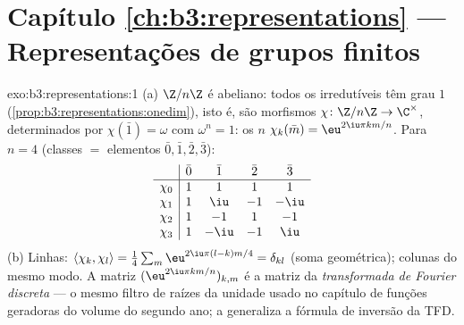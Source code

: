 \section*{Capítulo \ref{ch:b3:representations} --- Representações de grupos
finitos}

\begin{solution}{exo:b3:representations:1}
(a) $\Z/n\Z$ é abeliano: todos os irredutíveis têm grau $1$
(\cref{prop:b3:representations:onedim}), isto é, são morfismos
$\chi \colon \Z/n\Z \to \C^\times$, determinados por $\chi(\bar 1)
= \omega$ com $\omega^n = 1$: os $n$  $\chi_k(\bar
m) = \eu^{2\iu\pi km/n}$. Para $n = 4$ (classes $= $ elementos
$\bar0,\bar1,\bar2,\bar3$):
\[
\begin{array}{c|cccc}
& \bar0 & \bar1 & \bar2 & \bar3\\
\hline
\chi_0 & 1 & 1 & 1 & 1\\
\chi_1 & 1 & \iu & -1 & -\iu\\
\chi_2 & 1 & -1 & 1 & -1\\
\chi_3 & 1 & -\iu & -1 & \iu
\end{array}
\]
(b) Linhas: $\langle\chi_k,\chi_l\rangle = \frac14\sum_m
\eu^{2\iu\pi(l-k)m/4} = \delta_{kl}$ (soma geométrica); colunas do
mesmo modo. A matriz $(\eu^{2\iu\pi km/n})_{k,m}$ é a matriz da
\emph{transformada de Fourier discreta} --- o mesmo filtro de
raízes da unidade usado no capítulo de funções geradoras do
volume do segundo ano; a 
generaliza a fórmula de inversão da TFD.
\end{solution}

